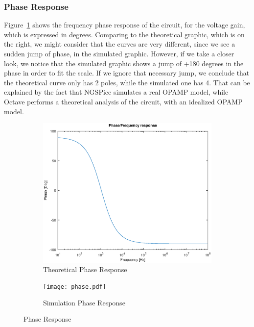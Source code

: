 \subsubsection{Phase Response}
Figure~\ref{fig:phase} shows the frequency phase response of the circuit, for the voltage gain, which is expressed in degrees. Comparing to the theoretical graphic, which is on the right, we might consider that the curves are very different, since we see a sudden jump of phase, in the simulated graphic. However, if we take a closer look, we notice that the simulated graphic shows a jump of +180 degrees in the phase in order to fit the scale. If we ignore that necessary jump, we conclude that the theoretical curve only has 2 poles, while the simulated one has 4. That can be explained by the fact that NGSPice simulates a real OPAMP model, while Octave performs a theoretical analysis of the circuit, with an idealized OPAMP model.
%
%
\begin{figure}[H]
\centering
\begin{subfigure}{.5\textwidth}
    \centering
    \vspace{2.8 cm}
    \includegraphics[scale=0.4]{phase_response.eps}
    \caption{Theoretical Phase Response}
\end{subfigure}%
\begin{subfigure}{.5\textwidth}
    \centering
    \texttt{[image: phase.pdf]}
    \caption{Simulation Phase Response}
\end{subfigure}
\caption{Phase Response}
\label{fig:phase}
\end{figure}
%
%
%
